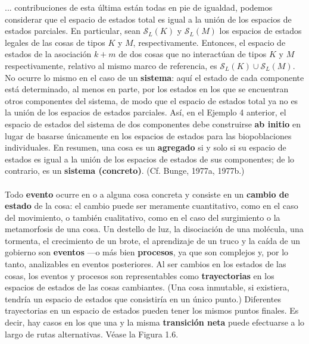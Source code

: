 {\fontsize{13}{15}\selectfont
... contribuciones de esta última están todas en pie de igualdad, podemos considerar que el espacio de estados total es igual a la unión de los espacios de estados parciales. En particular, sean $\mathcal{S}_L(K)$ y $\mathcal{S}_L(M)$ los espacios de estados legales de las cosas de tipos $K$ y $M$, respectivamente. Entonces, el espacio de estados de la asociación $k+m$ de dos cosas que no interactúan de tipos $K$ y $M$ respectivamente, relativo al mismo marco de referencia, es $\mathcal{S}_L(K) \cup \mathcal{S}_L(M)$. No ocurre lo mismo en el caso de un \textbf{sistema}: aquí el estado de cada componente está determinado, al menos en parte, por los estados en los que se encuentran otros componentes del sistema, de modo que el espacio de estados total ya no es la unión de los espacios de estados parciales. Así, en el Ejemplo 4 anterior, el espacio de estados del sistema de dos componentes debe construirse \textbf{ab initio} en lugar de basarse únicamente en los espacios de estados para las biopoblaciones individuales. En resumen, una cosa es un \textbf{agregado} si y solo si su espacio de estados es igual a la unión de los espacios de estados de sus componentes; de lo contrario, es un \textbf{sistema (concreto)}. (Cf. Bunge, 1977a, 1977b.)
\\
\\Todo \textbf{evento} ocurre en o a alguna cosa concreta y consiste en un \textbf{cambio de estado} de la cosa: el cambio puede ser meramente cuantitativo, como en el caso del movimiento, o también cualitativo, como en el caso del surgimiento o la metamorfosis de una cosa. Un destello de luz, la disociación de una molécula, una tormenta, el crecimiento de un brote, el aprendizaje de un truco y la caída de un gobierno son \textbf{eventos} —o más bien \textbf{procesos}, ya que son complejos y, por lo tanto, analizables en eventos posteriores. Al ser cambios en los estados de las cosas, los eventos y procesos son representables como \textbf{trayectorias} en los espacios de estados de las cosas cambiantes. (Una cosa inmutable, si existiera, tendría un espacio de estados que consistiría en un único punto.) Diferentes trayectorias en un espacio de estados pueden tener los mismos puntos finales. Es decir, hay casos en los que una y la misma \textbf{transición neta} puede efectuarse a lo largo de rutas alternativas. Véase la Figura 1.6.
\\
\\
}
